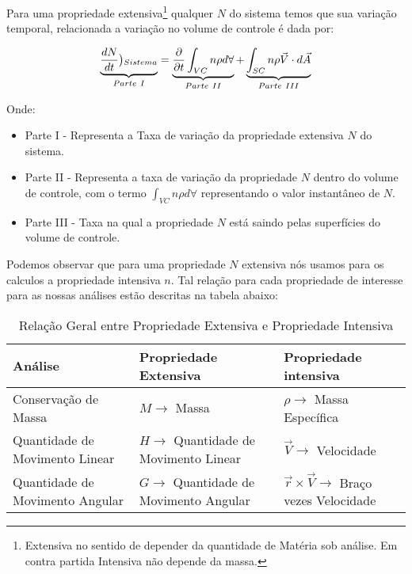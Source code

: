 \documentclass{article}
\begin{document}
        Para uma propriedade extensiva\footnote{Extensiva no sentido de depender da quantidade de Matéria sob análise. Em contra partida Intensiva não depende da massa.} qualquer $N$ do sistema
        temos que sua variação temporal, relacionada a variação no volume de controle é dada por:


        \begin{align}
            \underbrace{\frac{dN}{dt}\big{)_{Sistema}}}_{Parte \ I} = \underbrace{\frac{\partial }{\partial t} \int_{VC} n \rho d \forall}_{Parte \ II} + \underbrace{\int_{SC} n \rho \vec V \cdot d \vec A}_{Parte \ III}
        \end{align}

        Onde:
        \begin{itemize}
            \item Parte I - Representa a Taxa de variação da propriedade extensiva $N$ do sistema.
            \item Parte II - Representa a taxa de variação da propriedade $N$ dentro do volume de controle, com o termo $\int_{VC} n \rho d \forall$ representando o valor instantâneo de $N$.
            \item Parte III - Taxa na qual a propriedade $N$ está saindo pelas superfícies do volume de controle.
        \end{itemize}

        Podemos observar que para uma propriedade $N$ extensiva nós usamos para os calculos a propriedade intensiva $n$. Tal relação para cada propriedade de interesse para as nossas análises estão descritas na tabela abaixo:

        \begin{table}[H]
            \begin{tabularx}{\textwidth}{|l|X|X|} \hline
                \textbf{Análise} & \textbf{Propriedade Extensiva} & \textbf{Propriedade intensiva} \\ \hline
                Conservação de Massa & $M \rightarrow$ Massa & $\rho \rightarrow$ Massa Específica \\ \hline
                Quantidade de Movimento Linear & $H \rightarrow$ Quantidade de Movimento Linear & $\vec V \rightarrow$  Velocidade \\ \hline
                Quantidade de Movimento Angular & $G \rightarrow$ Quantidade de Movimento Angular & $\vec r \times \vec V \rightarrow$  Braço vezes Velocidade \\ \hline
            \end{tabularx}
            \caption{Relação Geral entre Propriedade Extensiva e Propriedade Intensiva}
        \end{table}
\end{document}
